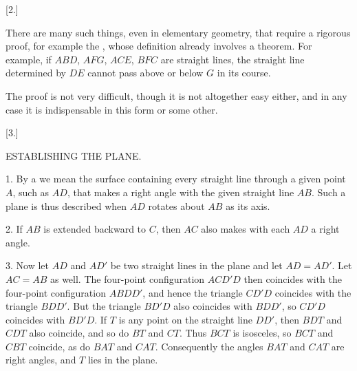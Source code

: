 \begin{center}[2.]\end{center}


There are many such things, even in elementary geometry, that require a rigorous
proof, for example the , whose definition already
involves a theorem. For example, if $ABD$, $AFG$, $ACE$, $BFC$ are straight lines,
the straight line determined by $DE$ cannot pass above or below $G$ in its
course.

\begin{center}

\end{center}

The proof is not very difficult, though it is not altogether easy either, and in any
case it is indispensable in this form or some other.



\begin{center}[3.]\end{center}


\begin{center}ESTABLISHING THE PLANE.\end{center}


1. By a  we mean the surface containing every straight line through a given point $A$,
such as $AD$, that makes a right angle with the given straight line $AB$.
Such a plane is thus described when $AD$ rotates about $AB$
as its axis.

2. If $AB$ is extended backward to $C$, then $AC$ also makes with each $AD$
a right angle.

\begin{center}

\end{center}

3. Now let $AD$ and $AD'$ be two straight lines in the plane and let $AD = AD'$. Let
$AC = AB$ as well. The four-point configuration $ACD'D$ then coincides with the
four-point configuration $ABDD'$, and hence the triangle $CD'D$ coincides with the triangle $BDD'$.
But the triangle $BD'D$ also coincides with $BDD'$, so $CD'D$ coincides with $BD'D$. If
$T$ is any point on the straight line $DD'$, then $BDT$ and
$CDT$ also coincide, and so do $BT$ and $CT$. Thus $BCT$ is isosceles, so
$BCT$ and $CBT$ coincide, as do $BAT$ and $CAT$. Consequently the angles $BAT$ and $CAT$
are right angles, and $T$ lies in the plane.


